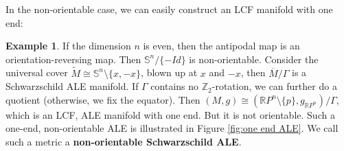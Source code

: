 \documentclass[12pt]{amsart}
\theoremstyle{definition}
\newtheorem{example}[theorem]{Example}
\begin{document}
In the non-orientable case, we can easily construct an LCF manifold with one end:

\begin{example}\label{one end ALE}
    If the dimension $n$ is even, then the antipodal map is an orientation-reversing map. Then $\mathbb{S}^n/\{-Id\}$ is non-orientable. Consider the universal cover $\tilde{M}\cong \mathbb{S}^n\setminus\{x,-x\}$, blown up at $x$ and $-x$, then $\overline{M}/\Gamma$ is a Schwarzschild ALE manifold. If $\Gamma$ contains no $\mathbb{Z}_2$-rotation, we can further do a quotient (otherwise, we fix the equator). Then $(M,g)\cong (\mathbb{R}P^n\setminus\{p\},g_{\mathbb{R}P^n})/\Gamma$, which is an LCF, ALE manifold with one end. But it is not orientable. Such a one-end, non-orientable ALE is illustrated in Figure \ref{fig:one end ALE}. We call such a metric a \textbf{non-orientable Schwarzschild ALE}.
\end{example}
\end{document}
